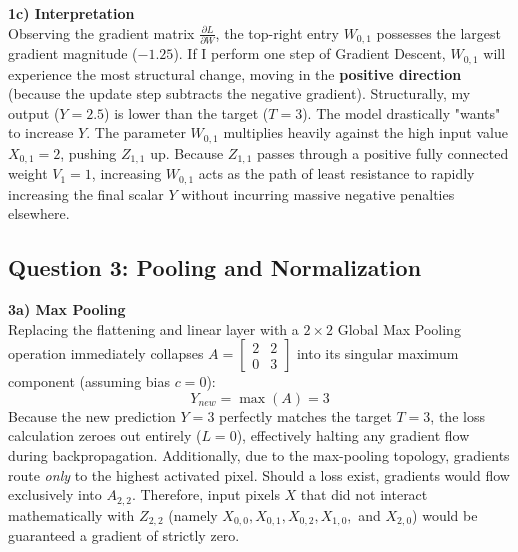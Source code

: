 \documentclass[12pt,a4paper]{article}
\begin{document}
\textbf{1c) Interpretation}\\
Observing the gradient matrix $\frac{\partial L}{\partial W}$, the top-right entry $W_{0,1}$ possesses the largest gradient magnitude ($-1.25$). If I perform one step of Gradient Descent, $W_{0,1}$ will experience the most structural change, moving in the \textbf{positive direction} (because the update step subtracts the negative gradient). Structurally, my output ($Y=2.5$) is lower than the target ($T=3$). The model drastically "wants" to increase $Y$. The parameter $W_{0,1}$ multiplies heavily against the high input value $X_{0,1} = 2$, pushing $Z_{1,1}$ up. Because $Z_{1,1}$ passes through a positive fully connected weight $V_1=1$, increasing $W_{0,1}$ acts as the path of least resistance to rapidly increasing the final scalar $Y$ without incurring massive negative penalties elsewhere.

\subsection*{Question 3: Pooling and Normalization}

\textbf{3a) Max Pooling}\\
Replacing the flattening and linear layer with a $2 \times 2$ Global Max Pooling operation immediately collapses $A = \begin{bmatrix} 2 & 2 \\ 0 & 3 \end{bmatrix}$ into its singular maximum component (assuming bias $c=0$):
\[ Y_{new} = \max(A) = 3 \]
Because the new prediction $Y=3$ perfectly matches the target $T=3$, the loss calculation zeroes out entirely ($L=0$), effectively halting any gradient flow during backpropagation. Additionally, due to the max-pooling topology, gradients route \textit{only} to the highest activated pixel. Should a loss exist, gradients would flow exclusively into $A_{2,2}$. Therefore, input pixels $X$ that did not interact mathematically with $Z_{2,2}$ (namely $X_{0,0}, X_{0,1}, X_{0,2}, X_{1,0},$ and $X_{2,0}$) would be guaranteed a gradient of strictly zero.
\end{document}
